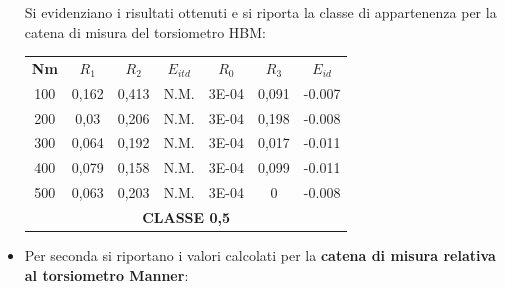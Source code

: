 \documentclass[a4paper, twoside]{article}
\begin{document}
\begin{itemize}
Si evidenziano i risultati ottenuti e si riporta la classe di appartenenza per la catena di misura del torsiometro HBM:

\begin{table}[H]
    \centering
    \renewcommand{\arraystretch}{1.2}
    \begin{tabular}{|c|c|c|c|c|c|c|}
        \hline
        \rowcolor{headerblue}
        \multicolumn{7}{|c|}{\textcolor{white}{\textbf{RISULTATI - HBM}}} \\
        \hline
        \rowcolor{rowlight}
        \textbf{Nm} & \textbf{$R_1$} & \textbf{$R_2$} & \textbf{$E_{itd}$} & \textbf{$R_0$} & \textbf{$R_3$} & \textbf{$E_{id}$} \\
        \hline
        100 & 0,162 & 0,413 & N.M. & 3E-04 & 0,091 & -0.007 \\
        \hline
        200 & 0,03 & 0,206 & N.M. & 3E-04 & 0,198 & -0.008 \\
        \hline
        300 & 0,064 & 0,192 & N.M. & 3E-04 & 0,017 & -0.011 \\
        \hline
        400 & 0,079 & 0,158 & N.M. & 3E-04 & 0,099 & -0.011 \\
        \hline
        500 & 0,063 & 0,203 & N.M. & 3E-04 & 0 & -0.008 \\
        \hline
        \multicolumn{7}{|c|}{\textbf{CLASSE 0,5}} \\
        \hline
    \end{tabular}
\end{table}


\item Per seconda si riportano i valori calcolati per la \textbf{catena di misura relativa al torsiometro Manner}:

\begin{table}[H]
    \centering
    \renewcommand{\arraystretch}{1.2}
\end{table}


\end{itemize}
\end{document}
